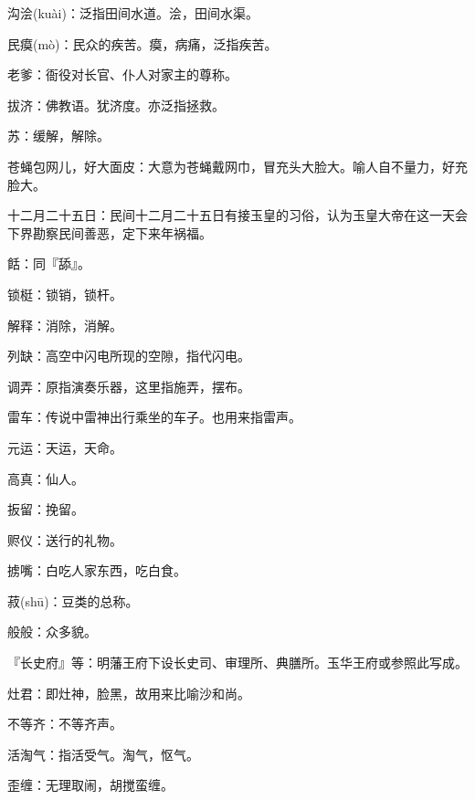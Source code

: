 \startbuffer[2276]
沟浍(kuài)：泛指田间水道。浍，田间水渠。
\stopbuffer


\startbuffer[2277]
民瘼(mò)：民众的疾苦。瘼，病痛，泛指疾苦。
\stopbuffer


\startbuffer[2278]
老爹：衙役对长官、仆人对家主的尊称。
\stopbuffer


\startbuffer[2279]
拔济：佛教语。犹济度。亦泛指拯救。
\stopbuffer


\startbuffer[2280]
苏：缓解，解除。
\stopbuffer


\startbuffer[2281]
苍蝇包网儿，好大面皮：大意为苍蝇戴网巾，冒充头大脸大。喻人自不量力，好充脸大。
\stopbuffer


\startbuffer[2282]
十二月二十五日：民间十二月二十五日有接玉皇的习俗，认为玉皇大帝在这一天会下界勘察民间善恶，定下来年祸福。
\stopbuffer


\startbuffer[2283]
餂：同『舔』。
\stopbuffer


\startbuffer[2284]
锁梃：锁销，锁杆。
\stopbuffer


\startbuffer[2285]
解释：消除，消解。
\stopbuffer


\startbuffer[2286]
列缺：高空中闪电所现的空隙，指代闪电。
\stopbuffer


\startbuffer[2287]
调弄：原指演奏乐器，这里指施弄，摆布。
\stopbuffer


\startbuffer[2288]
雷车：传说中雷神出行乘坐的车子。也用来指雷声。
\stopbuffer


\startbuffer[2289]
元运：天运，天命。
\stopbuffer


\startbuffer[2290]
高真：仙人。
\stopbuffer


\startbuffer[2291]
扳留：挽留。
\stopbuffer


\startbuffer[2292]
赆仪：送行的礼物。
\stopbuffer


\startbuffer[2293]
掳嘴：白吃人家东西，吃白食。
\stopbuffer


\startbuffer[2294]
菽(shū)：豆类的总称。
\stopbuffer


\startbuffer[2295]
般般：众多貌。
\stopbuffer


\startbuffer[2296]
『长史府』等：明藩王府下设长史司、审理所、典膳所。玉华王府或参照此写成。
\stopbuffer


\startbuffer[2297]
灶君：即灶神，脸黑，故用来比喻沙和尚。
\stopbuffer


\startbuffer[2298]
不等齐：不等齐声。
\stopbuffer


\startbuffer[2299]
活淘气：指活受气。淘气，怄气。
\stopbuffer


\startbuffer[2300]
歪缠：无理取闹，胡搅蛮缠。
\stopbuffer



